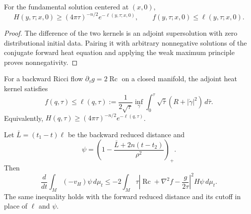 \begin{lemma}
\label{lem:chow-ii-ch16-adjoint-dominates-reduced}
For the fundamental solution centered at $(x,0)$,
\[
H(y,\tau;x,0)\ge(4\pi\tau)^{-n/2}e^{-\ell(y,\tau;x,0)},
\qquad f(y,\tau;x,0)\le\ell(y,\tau;x,0).
\]
\end{lemma}
\begin{proof}
\sketch The difference of the two kernels is an adjoint supersolution with zero
distributional initial data. Pairing it with arbitrary nonnegative solutions
of the conjugate forward heat equation and applying the weak maximum principle
proves nonnegativity.
\end{proof}

\begin{theorem}
\label{thm:chow-ii-ch16-reduced-distance-harnack}
For a backward Ricci flow $\partial_\tau g=2\operatorname{Rc}$ on a closed
manifold, the adjoint heat kernel satisfies
\[
f(q,\tau)\le\ell(q,\tau):=\frac1{2\sqrt\tau}
 \inf_\gamma\int_0^\tau\sqrt{\bar\tau}
 \left(R+|\dot\gamma|^2\right)\,d\bar\tau.
\]
Equivalently, $H(q,\tau)\ge(4\pi\tau)^{-n/2}e^{-\ell(q,\tau)}$.
\end{theorem}

\begin{theorem}
\label{thm:chow-ii-ch16-localized-perelman-entropy}
Let $\bar L=(t_1-t)\ell$ be the backward reduced distance and
\[
\psi=\left(1-\frac{\bar L+2n(t-t_2)}{\rho^2}\right)_+.
\]
Then
\[
\frac{d}{dt}\int_M(-v_H)\psi\,d\mu_t
\le-2\int_M\tau\left|\operatorname{Rc}+\nabla^2f-\frac{g}{2\tau}\right|^2H\psi\,d\mu_t.
\]
The same inequality holds with the forward reduced distance and its cutoff in
place of $\ell$ and $\psi$.
\end{theorem}
